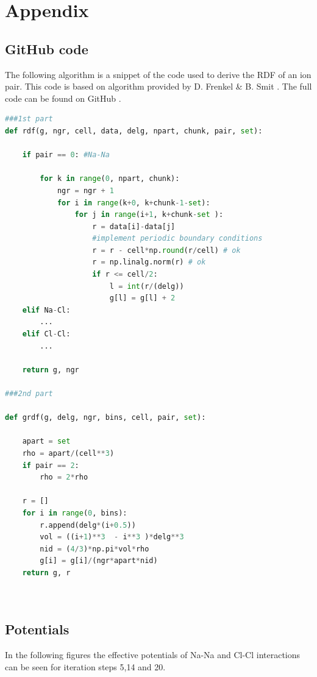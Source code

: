 \documentclass[10pt]{article}
\begin{document}
\newpage

\appendix

\section{Appendix}
\label{appendix}
    \subsection{GitHub code}
        \label{a:code}

        The following algorithm is a snippet of the code used to derive the RDF of an ion pair. This code is based on algorithm provided by D. Frenkel \& B. Smit \cite{Frenkel}. The full code can be found on GitHub \cite{GitHub}.
        
        \begin{lstlisting}[language=Python, caption=Sample from rdf.ipynb]
###1st part
def rdf(g, ngr, cell, data, delg, npart, chunk, pair, set):

    if pair == 0: #Na-Na

        for k in range(0, npart, chunk):
            ngr = ngr + 1 
            for i in range(k+0, k+chunk-1-set): 
                for j in range(i+1, k+chunk-set ):
                    r = data[i]-data[j]
                    #implement periodic boundary conditions
                    r = r - cell*np.round(r/cell) # ok
                    r = np.linalg.norm(r) # ok
                    if r <= cell/2: 
                        l = int(r/(delg))
                        g[l] = g[l] + 2
    elif Na-Cl:
        ...
    elif Cl-Cl:
        ...
    
    return g, ngr
    
###2nd part 
    
def grdf(g, delg, ngr, bins, cell, pair, set):

    apart = set 
    rho = apart/(cell**3)
    if pair == 2:
        rho = 2*rho

    r = []
    for i in range(0, bins): 
        r.append(delg*(i+0.5))
        vol = ((i+1)**3  - i**3 )*delg**3 
        nid = (4/3)*np.pi*vol*rho
        g[i] = g[i]/(ngr*apart*nid)  
    return g, r

    
    \end{lstlisting}
        
    \newpage
    \subsection{Potentials}
        \label{a:pot}
         In the following figures the effective potentials of Na-Na and Cl-Cl interactions can be seen for iteration steps 5,14 and 20.
         
\end{document}
